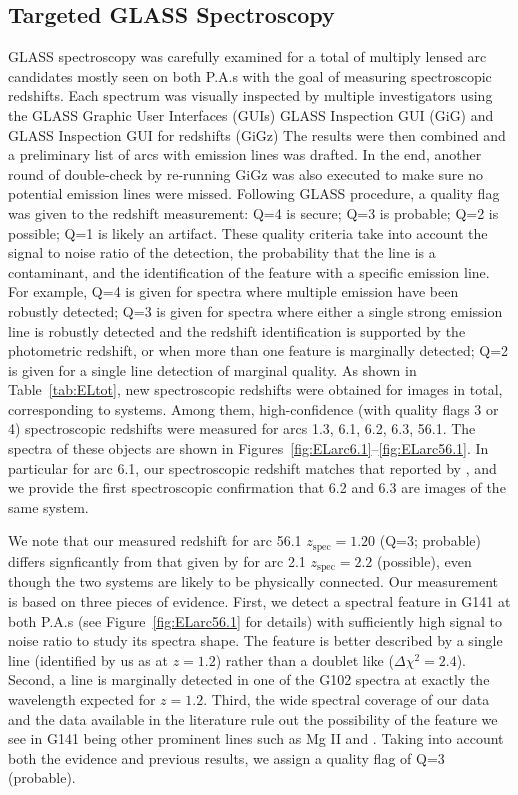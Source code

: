 \subsection{Targeted GLASS Spectroscopy}
\label{subsec:targeted}

GLASS spectroscopy was carefully examined for a total of \NimgTOT{}
multiply lensed arc candidates mostly seen on both P.A.s with the goal
of measuring spectroscopic redshifts.
Each spectrum was visually inspected by multiple investigators
using the GLASS Graphic User Interfaces (GUIs) GLASS
Inspection GUI (GiG) and GLASS Inspection GUI for redshifts (GiGz) The
results were then combined and a preliminary list of arcs with
emission lines was drafted. In the end, another round of double-check
by re-running GiGz was also executed to make sure no potential
emission lines were missed. Following GLASS procedure, a quality flag
was given to the redshift measurement: Q=4 is secure; Q=3 is probable;
Q=2 is possible; Q=1 is likely an artifact.
These quality criteria take into account the signal to noise ratio of
the detection, the probability that the line is a contaminant, and the
identification of the feature with a specific emission line. For
example, Q=4 is given for spectra where multiple emission have been
robustly detected; Q=3 is given for spectra where either a single
strong emission line is robustly detected and the redshift
identification is supported by the photometric redshift, or when more
than one feature is marginally detected; Q=2 is given for a single
line detection of marginal quality. As shown in Table~\ref{tab:ELtot},
new spectroscopic redshifts were obtained for \NimgELtot{} images in
total, corresponding to \NsysELtot{} systems. Among them, \NimgELhiQ{}
high-confidence (with quality flags 3 or 4) spectroscopic redshifts
were measured for arcs 1.3, 6.1, 6.2, 6.3, 56.1. The spectra of these
objects are shown in
Figures~\ref{fig:ELarc6.1}--\ref{fig:ELarc56.1}. In particular for arc
6.1, our spectroscopic redshift matches that reported by
\citet{2014MNRAS.444..268R}, and we provide the first spectroscopic
confirmation that 6.2 and 6.3 are images of the same system.

We note that our measured redshift for arc 56.1 $z_{\textrm{spec}}=1.20$ (Q=3; probable) differs signficantly
from that given by \citet{Johnson:2014p37801} for arc 2.1 $z_{\textrm{spec}}=2.2$ (possible), even though the two
systems are likely to be physically connected.  Our measurement is based on three pieces of evidence. First, we
detect a spectral feature in G141 at both P.A.s (see Figure~\ref{fig:ELarc56.1} for details) with sufficiently
high signal to noise ratio to study its spectra shape. The feature is better described by a single line
(identified by us as \Ha at $z=1.2$) rather than a doublet like \OIII ($\Delta \chi^2=2.4$). Second, a
line is marginally detected in one of the G102 spectra at exactly the wavelength expected for \OIII $z=1.2$.
Third, the wide spectral coverage of our data and the data available in the literature rule out the possibility
of the feature we see in G141 being other prominent lines such as Mg II and \OII. Taking into account both the
evidence and previous results, we assign a quality flag of Q=3 (probable).

